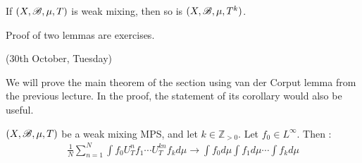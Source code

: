 \documentclass[10pt,a4paper]{report}
\newenvironment{proof}
{\begin{changemargin}{1cm}{0.5cm} 
	}%
	{\end{changemargin}
}
\begin{document}
\lem If $(X,\mathscr{B}, \mu, T)$ is weak mixing, then so is $(X,\mathscr{B}, \mu, T^k)$.
\begin{proof}
\pf Proof of two lemmas are exercises.
\end{proof}
\s

\newday

(30th October, Tuesday)
\s

We will prove the main theorem of the section using van der Corput lemma from the previous lecture. In the proof, the statement of its corollary would also be useful.
\s

\cor  $(X,\mathscr{B}, \mu, T)$ be a weak mixing MPS, and let $k\in \mathbb{Z}_{>0}$. Let $f_0 \in L^{\infty}$. Then :
\begin{align*}
\frac{1}{N} \sum_{n=1}^N \int f_0 U^n_T f_1 \cdots U^{kn}_T f_k d\mu \rightarrow \int f_0 d\mu \int f_1 d\mu \cdots \int f_k d\mu
\end{align*}
\s
\end{document}
